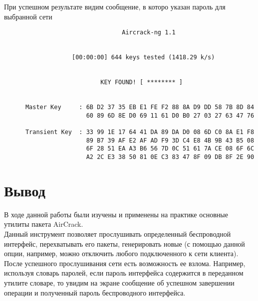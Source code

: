 \documentclass[10pt,a4paper]{report}
\begin{document}
При успешном результате видим сообщение, в которо указан пароль для выбранной сети
\begin{verbatim}   
                                 Aircrack-ng 1.1


                   [00:00:00] 644 keys tested (1418.29 k/s)


                           KEY FOUND! [ ******** ]


      Master Key     : 6B D2 37 35 EB E1 FE F2 88 8A D9 DD 58 7B 8D 84 
                       60 89 6D 8E D0 69 11 61 D0 B0 27 03 27 63 47 76 

      Transient Key  : 33 99 1E 17 64 41 DA 89 DA D0 08 6D C0 8A E1 F8 
                       89 B7 39 AF E2 AF AD F9 3D C4 E8 4B 9B 43 B5 08 
                       6F 28 51 EA A3 B6 56 7D 0C 51 61 7A CE 08 6F 6C 
                       A2 2C E3 38 50 81 0E C3 83 47 8F 09 DB 8F 2E 90 
\end{verbatim}

\section{Вывод}
В ходе данной работы были изучены и применены на практике основные утилиты пакета AirCrack. \\
Данный инструмент позволяет прослушивать определенный беспроводной интерфейс, перехватывать его пакеты, генерировать новые (с помощью данной опции, например, можно отключить любого подключенного к сети клиента). После успешного прослушивания сети есть возможность ее взлома. Например, используя словарь паролей, если пароль интерфейса содержится в переданном утилите словаре, то увидим на экране сообщение об успешном завершении операции и полученный пароль беспроводного интерфейса.
\end{document}
